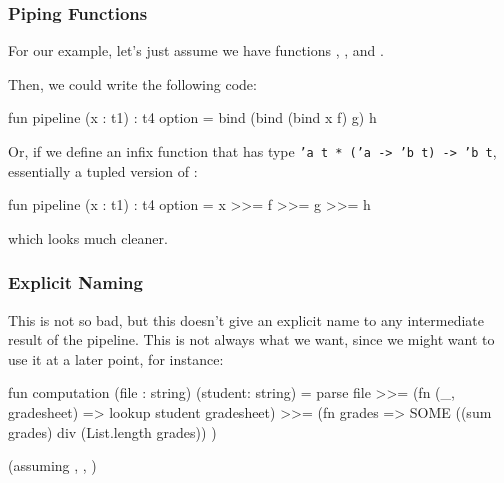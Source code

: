 \documentclass[aspectratio=169, handout]{beamer}
\begin{document}
\begin{frame}[fragile]
  \frametitle{Piping Functions}

  For our example, let's just assume we have functions ,
  , and .

  \vspace{\fill}

  Then, we could write the following code:
  \begin{codeblock}
    fun pipeline (x : t1) : t4 option =
      bind (bind (bind x f) g) h
  \end{codeblock}

  \vspace{\fill}

  Or, if we define an infix function \code{>>=} that has type
  \texttt{'a t * ('a -> 'b t) -> 'b t},
  essentially a tupled version of :

  \begin{codeblock}
    fun pipeline (x : t1) : t4 option =
      x >>= f >>= g >>= h
  \end{codeblock}

  \vspace{\fill}

  which looks much cleaner.
\end{frame}

\begin{frame}[fragile]
  \frametitle{Explicit Naming}

  This is not so bad, but this doesn't give an explicit name to any intermediate
  result of the pipeline. This is not always what we want, since we might want to
  use it at a later point, for instance:

  \vspace{\fill}

  \begin{codeblock}
    fun computation (file : string) (student: string) =
      parse file
      >>= (fn (_, gradesheet) => lookup student gradesheet)
      >>= (fn grades =>
        SOME ((sum grades) div (List.length grades))
      )
  \end{codeblock}

  \vspace{\fill}

  (assuming , , )
\end{frame}
\end{document}
